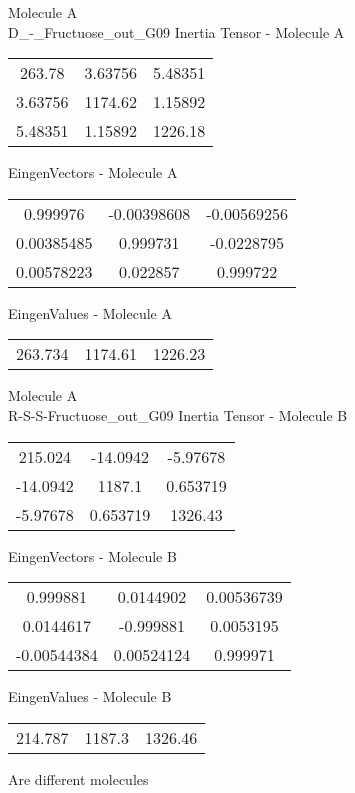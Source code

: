 \newpage
\begin{multicols}{2}
\begin{center}
Molecule A \\ 
D_-_Fructuose_out_G09
Inertia Tensor - Molecule A \\
\vtab
\begin{tabular}{|c c c|}
263.78	 & 	3.63756	 & 	5.48351	 \\
3.63756	 & 	1174.62	 & 	1.15892	 \\
5.48351	 & 	1.15892	 & 	1226.18
\end{tabular}

\vtab
 EingenVectors - Molecule A     \\
\vtab
\begin{tabular}{|c c c|}
0.999976	 & 	-0.00398608	 & 	-0.00569256	 \\
0.00385485	 & 	0.999731	 & 	-0.0228795	 \\
0.00578223	 & 	0.022857	 & 	0.999722
\end{tabular}

\vtab
 EingenValues - Molecule A     \\
\vtab
\begin{tabular}{|c c c|}
263.734	 & 	1174.61	 & 	1226.23
\end{tabular}
\columnbreak
Molecule A \\ 
R-S-S-Fructuose_out_G09
Inertia Tensor - Molecule B \\
\vtab
\begin{tabular}{|c c c|}
215.024	 & 	-14.0942	 & 	-5.97678	 \\
-14.0942	 & 	1187.1	 & 	0.653719	 \\
-5.97678	 & 	0.653719	 & 	1326.43
\end{tabular}

\vtab
 EingenVectors - Molecule B     \\
\vtab
\begin{tabular}{|c c c|}
0.999881	 & 	0.0144902	 & 	0.00536739	 \\
0.0144617	 & 	-0.999881	 & 	0.0053195	 \\
-0.00544384	 & 	0.00524124	 & 	0.999971
\end{tabular}

\vtab
 EingenValues - Molecule B     \\
\vtab
\begin{tabular}{|c c c|}
214.787	 & 	1187.3	 & 	1326.46
\end{tabular}
\textcolor{NavyBlue}{\large Are different molecules}
\end{center}
\end{multicols}
